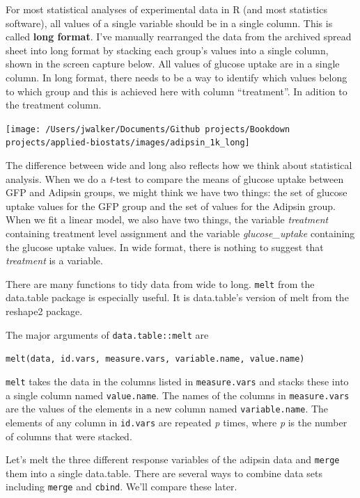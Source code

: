 \documentclass[]{book}
\begin{document}
For most statistical analyses of experimental data in R (and most statistics software), all values of a single variable should be in a single column. This is called \textbf{long format}. I've manually rearranged the data from the archived spread sheet into long format by stacking each group's values into a single column, shown in the screen capture below. All values of glucose uptake are in a single column. In long format, there needs to be a way to identify which values belong to which group and this is achieved here with column ``treatment''. In adition to the treatment column.

\texttt{[image: /Users/jwalker/Documents/Github projects/Bookdown projects/applied-biostats/images/adipsin\_1k\_long]}

The difference between wide and long also reflects how we think about statistical analysis. When we do a \emph{t}-test to compare the means of glucose uptake between GFP and Adipsin groups, we might think we have two things: the set of glucose uptake values for the GFP group and the set of values for the Adipsin group. When we fit a linear model, we also have two things, the variable \emph{treatment} containing treatment level assignment and the variable \emph{glucose\_uptake} containing the glucose uptake values. In wide format, there is nothing to suggest that \emph{treatment} is a variable.

There are many functions to tidy data from wide to long. \texttt{melt} from the data.table package is especially useful. It is data.table's version of melt from the reshape2 package.

The major arguments of \texttt{data.table::melt} are

\texttt{melt(data,\ id.vars,\ measure.vars,\ variable.name,\ value.name)}

\texttt{melt} takes the data in the columns listed in \texttt{measure.vars} and stacks these into a single column named \texttt{value.name}. The names of the columns in \texttt{measure.vars} are the values of the elements in a new column named \texttt{variable.name}. The elements of any column in \texttt{id.vars} are repeated \emph{p} times, where \emph{p} is the number of columns that were stacked.

Let's melt the three different response variables of the adipsin data and \texttt{merge} them into a single data.table. There are several ways to combine data sets including \texttt{merge} and \texttt{cbind}. We'll compare these later.
\end{document}
